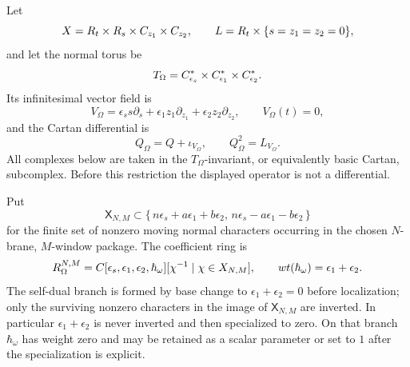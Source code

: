 \begin{defn}
\label{def:app-normal-omega-costello-kernel-datum}
  Let
  \[
    X=R_t\times R_s\times C_{z_1}\times C_{z_2},
    \qquad
    L=R_t\times\{s=z_1=z_2=0\},
  \]
  and let the normal torus be
  \[
    T_\Omega=
    C^*_{\epsilon_s}\times
    C^*_{\epsilon_1}\times
    C^*_{\epsilon_2}.
  \]
  Its infinitesimal vector field is
  \[
    V_\Omega=
      \epsilon_s s\partial_s
      +\epsilon_1z_1\partial_{z_1}
      +\epsilon_2z_2\partial_{z_2},
    \qquad V_\Omega(t)=0,
  \]
  and the Cartan differential is
  \[
    Q_\Omega=Q+\iota_{V_\Omega},
    \qquad
    Q_\Omega^2=L_{V_\Omega}.
  \]
  All complexes below are taken in the \(T_\Omega\)-invariant, or
  equivalently basic Cartan, subcomplex.  Before this restriction the
  displayed operator is not a differential.

  Put
  \[
    \mathsf X_{N,M}
      \subset
    \{\,n\epsilon_s+a\epsilon_1+b\epsilon_2,\,
        n\epsilon_s-a\epsilon_1-b\epsilon_2\,\}
  \]
  for the finite set of nonzero moving normal characters occurring in the
  chosen \(N\)-brane, \(M\)-window package.  The coefficient ring is
  \[
    R_\Omega^{N,M}
      =
    C[\epsilon_s,\epsilon_1,\epsilon_2,\hbar_\omega]
      [\chi^{-1}\mid\chi\in X_{N,M}],
    \qquad
    wt(\hbar_\omega)=
      \epsilon_1+\epsilon_2 .
  \]
  The self-dual branch is formed by base change to
  \(\epsilon_1+\epsilon_2=0\) before localization; only the surviving
  nonzero characters in the image of \(\mathsf X_{N,M}\) are inverted.
  In particular \(\epsilon_1+\epsilon_2\) is never inverted and then
  specialized to zero.  On that branch \(\hbar_\omega\) has weight zero
  and may be retained as a scalar parameter or set to \(1\) after the
  specialization is explicit.


\end{defn}
